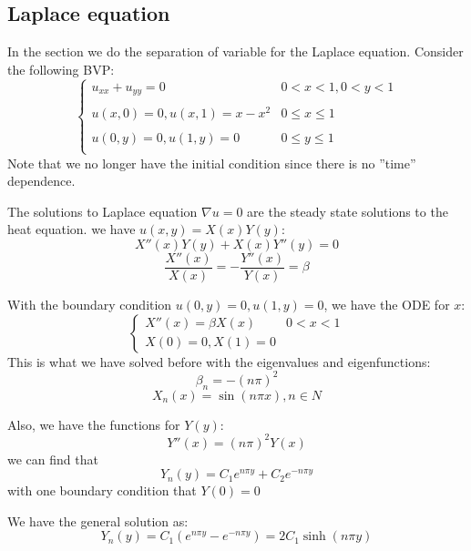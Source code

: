 \documentclass[12pt]{article} %
\begin{document}
\subsection{Laplace equation}
\hspace{5mm} In the section we do the separation of variable for the Laplace equation. Consider the following BVP:
\begin{equation}
\left\{
\begin{array}{lll}
u_{xx}+u_{yy} = 0& 0<x<1, 0<y<1 \\
 \\
u(x, 0) =0, u(x, 1) =x-x^{2}& 0\leq x\leq1\\
 \\
u(0, y) =0, u(1, y) =0& 0\leq y\leq1\\
\end{array}
\right.
\end{equation}Note that we no longer have the initial condition since there is no ''time'' dependence.\par
The solutions to Laplace equation $\nabla u=0$ are the steady state solutions to the heat equation. we have $u(x,y)=X(x)Y(y)$:
$$
X''(x)Y(y) +X(x)Y''(y) = 0
$$
$$
\frac{X''(x)}{X(x)} = -\frac{Y''(x)}{Y(x)}=\beta
$$\par
With the boundary condition $u(0, y) =0, u(1, y) =0$, we have the ODE for $x$:
$$
\left\{
\begin{array}{lll}
X''(x) = \beta X(x) & 0<x<1\\
X(0) = 0, X(1) =0 
\end{array}
\right.
$$
This is what we have solved before with the eigenvalues and eigenfunctions:
$$
\beta_{n}= -(n\pi)^{2}
$$
$$
X_{n}(x) = \sin(n\pi x), n\in N
$$\par
Also, we have the functions for $Y(y)$:
$$
Y''(x) =(n\pi)^{2} Y(x)
$$ we can find that 
$$
Y_{n}(y) = C_{1}e^{n\pi y}+C_{2}e^{-n\pi y}
$$with one boundary condition that $Y(0) = 0$
\par
We have the general solution as:
$$
Y_{n}(y) = C_{1}(e^{n\pi y}-e^{-n\pi y}) =2C_{1}\sinh(n\pi y)
$$
\end{document}

